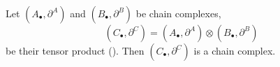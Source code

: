 \begin{proposition}
  Let $(A_\bullet, \partial^A)$ and $(B_\bullet, \partial^B)$
  be chain complexes,
  \begin{equation}
    (C_\bullet, \partial^C)
    = (A_\bullet, \partial^A) \otimes (B_\bullet, \partial^B)
  \end{equation}
  be their tensor product ().
  Then $(C_\bullet, \partial^C)$ is a chain complex.
\end{proposition}
